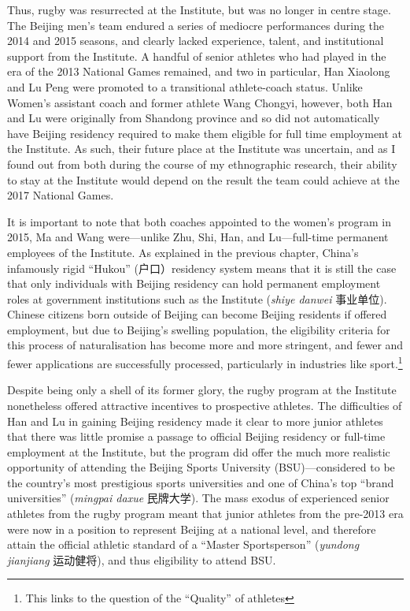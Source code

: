   Thus, rugby was resurrected at the Institute, but was no longer in centre stage. The Beijing men's team endured a series of mediocre performances during the 2014 and 2015 seasons, and clearly lacked experience, talent, and institutional support from the Institute.  A handful of senior athletes who had played in the era of the 2013 National Games remained, and two in particular, Han Xiaolong and Lu Peng were promoted to a transitional athlete-coach status. Unlike Women's assistant coach and former athlete Wang Chongyi, however, both Han and Lu were originally from Shandong province and so did not automatically have Beijing residency required to make them eligible for full time employment at the Institute. As such, their future place at the Institute was uncertain, and as I found out from both during the course of my ethnographic research, their ability to stay at the Institute would depend on the result the team could achieve at the 2017 National Games.

  It is important to note that both coaches appointed to the women's program in 2015, Ma and Wang were---unlike Zhu, Shi, Han, and Lu---full-time permanent employees of the Institute. As explained in the previous chapter, China's infamously rigid ``Hukou'' (户口）residency system means that it is still the case that only individuals with Beijing residency can hold permanent employment roles at government institutions such as the Institute (\textit{shiye danwei} 事业单位).  Chinese citizens born outside of Beijing can become Beijing residents if offered employment, but due to Beijing's swelling population, the eligibility criteria for this process of naturalisation has become more and more stringent, and fewer and fewer applications are successfully processed, particularly in industries like sport.\footnote{This links to the question of the ``Quality'' of athletes}

  Despite being only a shell of its former glory, the rugby program at the Institute nonetheless offered attractive incentives to prospective athletes.  The difficulties of Han and Lu in gaining Beijing residency made it clear to more junior athletes that there was little promise a passage to official Beijing residency or full-time employment at the Institute, but the program did offer the much more realistic opportunity of attending the Beijing Sports University (BSU)---considered to be the country's most prestigious sports universities and one of China's top ``brand universities'' (\textit{mingpai daxue} 民牌大学).  The mass exodus of experienced senior athletes from the rugby program meant that junior athletes from the pre-2013 era were now in a position to represent Beijing at a national level, and therefore attain the official athletic standard of a ``Master Sportsperson'' (\textit{yundong jianjiang} 运动健将), and thus eligibility to attend BSU.


